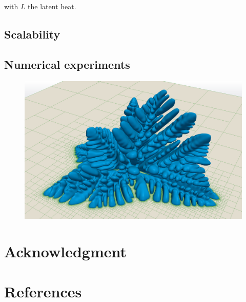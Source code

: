 \documentclass{elsarticle}
\begin{document}
with $L$ the latent heat.

\subsection{Scalability}

\subsection{Numerical experiments}

\begin{figure}[ht!]
\begin{center}
\includegraphics[width=.8\textwidth]{pictures/crystal_grid_low.png}
\end{center}
\end{figure}

\section{Acknowledgment}

\section*{References}


\end{document}
